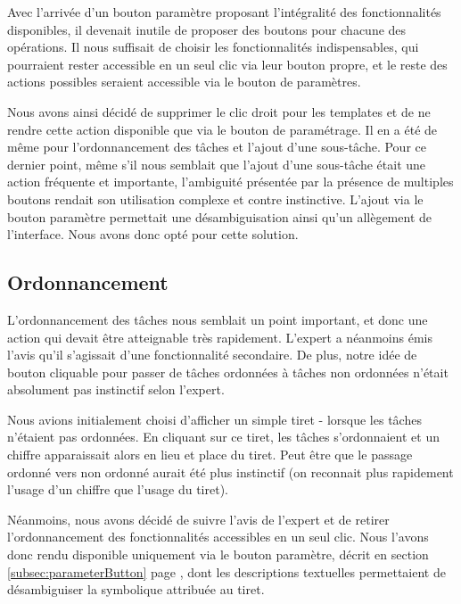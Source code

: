 \documentclass[11pt]{article}
\begin{document}
Avec l'arrivée d'un bouton paramètre proposant l'intégralité des
fonctionnalités disponibles, il devenait inutile de proposer des
boutons pour chacune des opérations. Il nous suffisait de choisir les
fonctionnalités indispensables, qui pourraient rester accessible en un
seul clic via leur bouton propre, et le reste des actions possibles
seraient accessible via le bouton de paramètres.

Nous avons ainsi décidé de supprimer le clic droit pour les templates
et de ne rendre cette action disponible que via le bouton de
paramétrage. Il en a été de même pour l'ordonnancement des tâches et
l'ajout d'une sous-tâche. Pour ce dernier point, même s'il nous
semblait que l'ajout d'une sous-tâche était une action fréquente et
importante, l'ambiguité présentée par la présence de multiples boutons
rendait son utilisation complexe et contre instinctive. L'ajout via le
bouton paramètre permettait une désambiguisation ainsi qu'un
allègement de l'interface. Nous avons donc opté pour cette solution.



\subsection{Ordonnancement}

L'ordonnancement des tâches nous semblait un point important, et donc
une action qui devait être atteignable très rapidement. L'expert a
néanmoins émis l'avis qu'il s'agissait d'une fonctionnalité
secondaire. De plus, notre idée de bouton cliquable pour passer de
tâches ordonnées à tâches non ordonnées n'était absolument pas
instinctif selon l'expert.

Nous avions initialement choisi d'afficher un simple tiret - lorsque
les tâches n'étaient pas ordonnées. En cliquant sur ce tiret, les
tâches s'ordonnaient et un chiffre apparaissait alors en lieu et place
du tiret. Peut être que le passage ordonné vers non ordonné aurait été
plus instinctif (on reconnait plus rapidement l'usage d'un chiffre que
l'usage du tiret).

Néanmoins, nous avons décidé de suivre l'avis de l'expert et de
retirer l'ordonnancement des fonctionnalités accessibles en un seul
clic. Nous l'avons donc rendu disponible uniquement via le bouton
paramètre, décrit en section \ref{subsec:parameterButton} page
\pageref{subsec:parameterButton}, dont les descriptions textuelles
permettaient de désambiguiser la symbolique attribuée au tiret.
\end{document}
